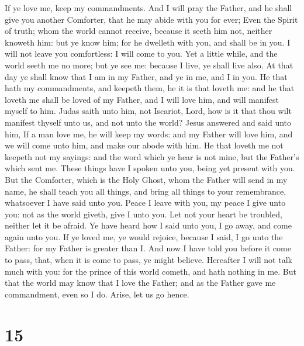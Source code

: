  If ye love me, keep my commandments.  And I
will pray the Father, and he shall give you another Comforter, that he
may abide with you for ever;  Even the Spirit of truth;
whom the world cannot receive, because it seeth him not, neither knoweth
him: but ye know him; for he dwelleth with you, and shall be in you.
 I will not leave you comfortless: I will come to you.
 Yet a little while, and the world seeth me no more; but ye
see me: because I live, ye shall live also.  At that day ye
shall know that I am in my Father, and ye in me, and I in you.
 He that hath my commandments, and keepeth them, he it is
that loveth me: and he that loveth me shall be loved of my Father, and I
will love him, and will manifest myself to him.  Judas
saith unto him, not Iscariot, Lord, how is it that thou wilt manifest
thyself unto us, and not unto the world?  Jesus answered
and said unto him, If a man love me, he will keep my words: and my
Father will love him, and we will come unto him, and make our abode with
him.  He that loveth me not keepeth not my sayings: and the
word which ye hear is not mine, but the Father's which sent me.
 These things have I spoken unto you, being yet present
with you.  But the Comforter, which is the Holy Ghost, whom
the Father will send in my name, he shall teach you all things, and
bring all things to your remembrance, whatsoever I have said unto you.
 Peace I leave with you, my peace I give unto you: not as
the world giveth, give I unto you. Let not your heart be troubled,
neither let it be afraid.  Ye have heard how I said unto
you, I go away, and come again unto you. If ye loved me, ye would
rejoice, because I said, I go unto the Father: for my Father is greater
than I.  And now I have told you before it come to pass,
that, when it is come to pass, ye might believe.  Hereafter
I will not talk much with you: for the prince of this world cometh, and
hath nothing in me.  But that the world may know that I
love the Father; and as the Father gave me commandment, even so I do.
Arise, let us go hence.

\hypertarget{section-14}{%
\section{15}\label{section-14}}

